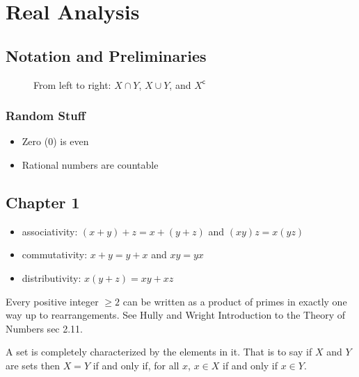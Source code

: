 \chapter{Real Analysis}

\section{Notation and Preliminaries}

\begin{figure}[H]
  \begin{center}
    \caption{From left to right: $X\cap Y$, $X\cup Y$, and $X^{\mathsf{c}}$}
  \end{center}
\end{figure}

\subsection{Random Stuff}

\begin{itemize}
  \item{Zero (0) is even}
  \item{Rational numbers are countable}
\end{itemize}

\section{Chapter 1}

\begin{itemize}
  \item{associativity: $(x+y)+z=x+(y+z)$ and $(xy)z=x(yz)$}
  \item{commutativity: $x+y=y+x$ and $xy=yx$}
  \item{distributivity: $x(y+z)=xy+xz$}
\end{itemize}

\begin{defn-dan}
  Every positive integer $\geq2$ can be written as a product of primes in exactly one way up to rearrangements.
  See Hully and Wright Introduction to the Theory of Numbers sec 2.11.
\end{defn-dan}

\begin{rem-dan}
  A set is completely characterized by the elements in it.
  That is to say if $X$ and $Y$ are sets then $X=Y$ if and only if, for all $x$, $x\in X$ if and only if $x\in Y$.
\end{rem-dan}

